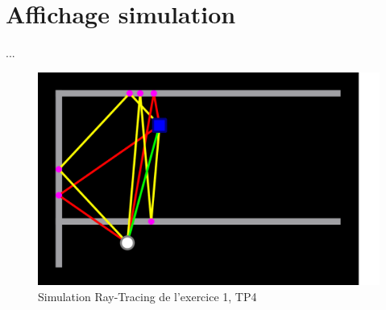 \section{Affichage simulation}
...

\begin{figure}[H]
    \centering
    \includegraphics[width=\textwidth]{latex/images/tp4.png}
    \caption{Simulation Ray-Tracing de l'exercice 1, TP4}
    \label{fig:simu-tp4}
\end{figure}
